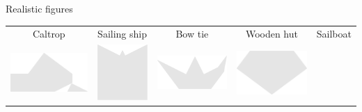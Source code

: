\documentclass[14pt]{beamer}
\begin{document}
\begin{frame}{Realistic figures}
\begin{center}
{\begin{tabular}{ccccc}
                Caltrop & Sailing ship & Bow tie & Wooden hut & Sailboat \\[4ex]
                \!\!\includegraphics[scale=0.20]{figures/figure026b.pdf}  \!\!&
                \!\!\includegraphics[scale=0.20]{figures/figure026p.pdf}  \!\!&
                \!\!\includegraphics[scale=0.20]{figures/figure026a.pdf}  \!\!&
                \!\!\includegraphics[scale=0.20]{figures/figure026f.pdf}  \!\!&

\end{tabular}}
\end{center}
\end{frame}
\end{document}
